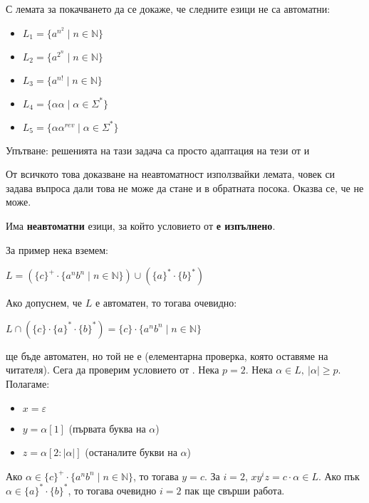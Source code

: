 \begin{problem}
С лемата за покачването да се докаже, че следните езици не са автоматни:
\begin{itemize}
    \item $L_1 = \{ a^{n^2} \mid n \in \mathbb{N} \}$
    \item $L_2 = \{ a^{2^n} \mid n \in \mathbb{N} \}$
    \item $L_3 = \{ a^{n!} \mid n \in \mathbb{N} \}$
    \item $L_4 = \{ \alpha \alpha \mid \alpha \in \Sigma^* \}$
    \item $L_5 = \{ \alpha \alpha^{rev} \mid \alpha \in \Sigma^* \}$
\end{itemize}
Упътване: решенията на тази задача са просто адаптация на тези от  и 
\end{problem}

\pagebreak


От всичкото това доказване на неавтоматност използвайки лемата, човек си задава въпроса дали това не може да стане и в обратната посока.
Оказва се, че не може.

\begin{warning}
    Има \textbf{неавтоматни} езици, за който условието от  \textbf{е изпълнено}.
\end{warning}
За пример нека вземем:
\begin{center}
    $L = (\{ c \}^+ \cdot \{ a^nb^n \mid n \in \mathbb{N} \}) \cup (\{ a \}^* \cdot \{ b \}^*)$
\end{center}
Ако допуснем, че $L$ е автоматен, то тогава очевидно:
\begin{center}
    $L \cap (\{ c \} \cdot \{ a \}^* \cdot \{ b \}^*) = \{ c \} \cdot \{ a^nb^n \mid n \in \mathbb{N} \}$
\end{center}
ще бъде автоматен, но той не е (елементарна проверка, която оставяме на читателя).
Сега да проверим условието от .
Нека $p = 2$.
Нека $\alpha \in L, \: |\alpha| \geq p$.
Полагаме:
\begin{itemize}
    \item $x = \varepsilon$
    \item $y = \alpha[1]$ (първата буква на $\alpha$)
    \item $z = \alpha[2:|\alpha|]$ (останалите букви на $\alpha$)
\end{itemize}
Ако $\alpha \in \{ c \}^+ \cdot \{ a^nb^n \mid n \in \mathbb{N} \}$, то тогава $y = c$.
За $i = 2$, $xy^iz = c \cdot \alpha \in L$.
Ако пък $\alpha \in \{ a \}^* \cdot \{ b \}^*$, то тогава очевидно $i = 2$ пак ще свърши работа.